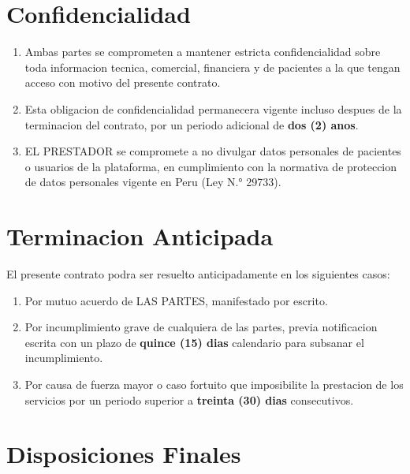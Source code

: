 \documentclass[12pt,a4paper]{article}
\begin{document}
\section{Confidencialidad}

\begin{enumerate}[label=\textbf{\color{pink}\arabic*.}, leftmargin=2em, itemsep=0.4em]
  \item Ambas partes se comprometen a mantener estricta confidencialidad sobre toda informacion tecnica, comercial, financiera y de pacientes a la que tengan acceso con motivo del presente contrato.
  \item Esta obligacion de confidencialidad permanecera vigente incluso despues de la terminacion del contrato, por un periodo adicional de \textbf{dos (2) anos}.
  \item EL PRESTADOR se compromete a no divulgar datos personales de pacientes o usuarios de la plataforma, en cumplimiento con la normativa de proteccion de datos personales vigente en Peru (Ley N.° 29733).
\end{enumerate}

\section{Terminacion Anticipada}

El presente contrato podra ser resuelto anticipadamente en los siguientes casos:

\begin{enumerate}[label=\textbf{\alph*)}, leftmargin=2em, itemsep=0.3em]
  \item Por mutuo acuerdo de LAS PARTES, manifestado por escrito.
  \item Por incumplimiento grave de cualquiera de las partes, previa notificacion escrita con un plazo de \textbf{quince (15) dias} calendario para subsanar el incumplimiento.
  \item Por causa de fuerza mayor o caso fortuito que imposibilite la prestacion de los servicios por un periodo superior a \textbf{treinta (30) dias} consecutivos.
\end{enumerate}

\section{Disposiciones Finales}
\end{document}
